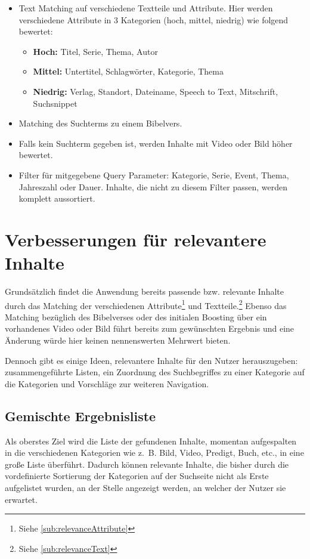 \begin{itemize}
  \item Text Matching auf verschiedene Textteile und Attribute. Hier werden verschiedene Attribute in 3 Kategorien (hoch, mittel, niedrig) wie folgend bewertet:
  \begin{itemize}
    \item \textbf{Hoch:} Titel, Serie, Thema, Autor
    \item \textbf{Mittel:} Untertitel, Schlagwörter, Kategorie, Thema
    \item \textbf{Niedrig:} Verlag, Standort, Dateiname, Speech to Text, Mitschrift, Suchsnippet
  \end{itemize}
  \item Matching des Suchterms zu einem Bibelvers.
  \item Falls kein Suchterm gegeben ist, werden Inhalte mit Video oder Bild höher bewertet.
  \item Filter für mitgegebene Query Parameter: Kategorie, Serie, Event, Thema, Jahreszahl oder Dauer. Inhalte, die nicht zu diesem Filter passen, werden komplett aussortiert.
\end{itemize}

\section{Verbesserungen für relevantere Inhalte}
\label{sec:potential}

Grundsätzlich findet die Anwendung bereits passende bzw. relevante Inhalte durch das Matching der verschiedenen Attribute\footnote{Siehe \ref{sub:relevanceAttribute}} und Textteile.\footnote{Siehe \ref{sub:relevanceText}}
Ebenso das Matching bezüglich des Bibelverses oder des initialen Boosting über ein vorhandenes Video oder Bild führt bereits zum gewünschten Ergebnis und eine Änderung würde hier keinen nennenswerten Mehrwert bieten.

Dennoch gibt es einige Ideen, relevantere Inhalte für den Nutzer herauszugeben: zusammengeführte Listen, ein Zuordnung des Suchbegriffes zu einer Kategorie auf die Kategorien und Vorschläge zur weiteren Navigation.

\subsection{Gemischte Ergebnisliste}
\label{sub:unifiedList}
Als oberstes Ziel wird die Liste der gefundenen Inhalte, momentan aufgespalten in die verschiedenen Kategorien wie z. B. Bild, Video, Predigt, Buch, etc., in eine große Liste überführt.
Dadurch können relevante Inhalte, die bisher durch die vordefinierte Sortierung der Kategorien auf der Suchseite nicht als Erste aufgelistet wurden, an der Stelle angezeigt werden, an welcher der Nutzer sie erwartet.

